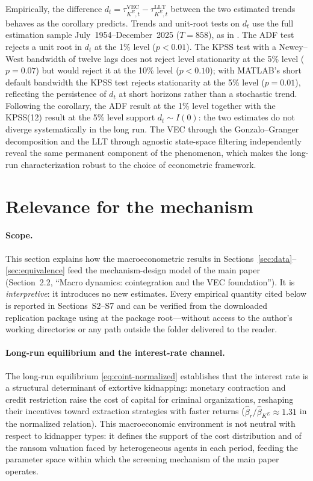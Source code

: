\documentclass[ecta,nameyear,final,supplement]{econsocart}
\numberwithin{equation}{section}
\numberwithin{table}{section}
\theoremstyle{definition}
\newcommand{\KE}{K^{E}}
\begin{document}
Empirically, the difference
$d_t = \tau^{\mathrm{VEC}}_{\KE,t} - \tau^{\mathrm{LLT}}_{\KE,t}$ between
the two estimated trends behaves as the corollary predicts. Trends and
unit-root tests on $d_t$ use the full estimation sample July~1954--December~2025
($T=858$), as in . The ADF test rejects a unit
root in $d_t$ at the
1\% level ($p<0.01$). The KPSS test with a Newey--West bandwidth of twelve
lags does not reject level stationarity at the 5\% level ($p=0.07$) but
would reject it at the 10\% level ($p<0.10$); with MATLAB's short default
bandwidth the KPSS test rejects stationarity at the 5\% level ($p=0.01$),
reflecting the persistence of $d_t$ at short horizons rather than a stochastic
trend. Following the corollary, the ADF result at the 1\% level together
with the KPSS(12) result at the 5\% level support $d_t\sim I(0)$: the two
estimates do not diverge systematically in the long run. The VEC through the
Gonzalo--Granger decomposition and the LLT through agnostic state-space
filtering independently reveal the same permanent component of the
phenomenon, which makes the long-run characterization robust to the choice
of econometric framework.

\section{Relevance for the mechanism}
\label{sec:relevance}

\paragraph{Scope.}
This section explains how the macroeconometric results in
Sections~\ref{sec:data}--\ref{sec:equivalence} feed the mechanism-design model
of the main paper (Section~2.2, ``Macro dynamics: cointegration and the VEC
foundation''). It is \emph{interpretive}: it introduces no new estimates. Every
empirical quantity cited below is reported in Sections~S2--S7 and can be
verified from the downloaded replication package using
 at the package root---without access to the author's
working directories or any path outside the folder delivered to the reader.

\paragraph{Long-run equilibrium and the interest-rate channel.}
The long-run equilibrium \eqref{eq:coint-normalized} establishes that the
interest rate is a structural determinant of extortive kidnapping: monetary
contraction and credit restriction raise the cost of capital for criminal
organizations, reshaping their incentives toward extraction strategies with
faster returns ($\hat\beta_r/\hat\beta_{\KE}\approx 1.31$ in the normalized
relation). This macroeconomic environment is not neutral with respect to
kidnapper types: it defines the support of the cost distribution and of the
ransom valuation faced by heterogeneous agents in each period, feeding the
parameter space within which the screening mechanism of the main paper
operates.
\end{document}

